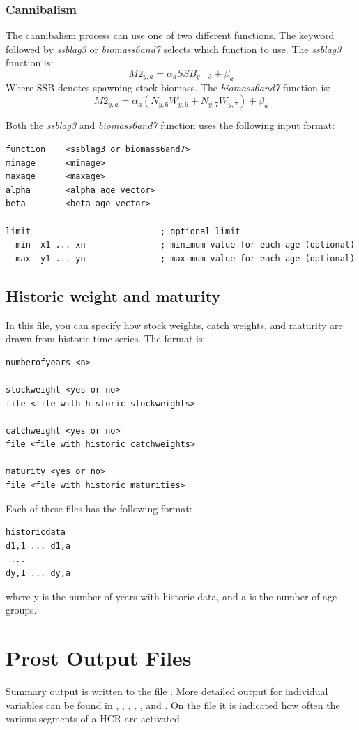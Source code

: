\documentclass[12pt,twoside,a4paper]{article}
\begin{document}
\subsubsection{Cannibalism}
The cannibalism process can use one of two different functions.
The  keyword followed by \emph{ssblag3} or
\emph{biomass6and7} selects which function to use.
The \emph{ssblag3} function is:
\[
  {M2}_{y,a}=\alpha_a{SSB}_{y-3}+\beta_a
\]
Where SSB denotes spawning stock biomass. 
The \emph{biomass6and7} function is:
\[
  {M2}_{y,a}=\alpha_a(N_{y,6}W_{y,6}+N_{y,7}W_{y,7})+\beta_a
\]

Both the \emph{ssblag3} and \emph{biomass6and7} function uses the following
input format:
\begin{verbatim}
function    <ssblag3 or biomass6and7>
minage      <minage>
maxage      <maxage>
alpha       <alpha age vector>
beta        <beta age vector>   

limit                          ; optional limit  
  min  x1 ... xn               ; minimum value for each age (optional)
  max  y1 ... yn               ; maximum value for each age (optional)
\end{verbatim}


\subsection{Historic weight and maturity}
\label{historic}
In this file, you can specify how stock weights, catch weights, 
and maturity are drawn from historic time series. The format is:

\begin{verbatim}
numberofyears <n>

stockweight <yes or no>
file <file with historic stockweights>

catchweight <yes or no>
file <file with historic catchweights>

maturity <yes or no>
file <file with historic maturities>
\end{verbatim}

Each of these files has the following format:

\begin{verbatim}
historicdata
d1,1 ... d1,a
 ...
dy,1 ... dy,a
\end{verbatim}

where y is the number of years with historic data, and a is the number of 
age groups.

\section{Prost Output Files}
\label{output}
Summary output is written to the file .  More detailed
output for individual variables can be found in ,
, , , 
, and
. On the file  it is indicated how often the various 
segments of a HCR are activated. 
\end{document}
